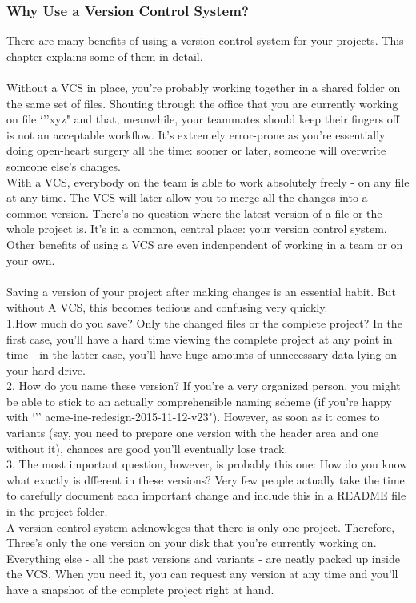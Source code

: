 \documentclass{book}
\begin{document}
   \section{Why Use a Version Control System?}
   There are many benefits of using a version control system for your projects. This chapter explains some of them in detail.\\
   \textbf{}\\
   Without a VCS in place, you're probably working together in a shared folder on the same set of files. Shouting through the office that you are currently working on file `''xyz" and that, meanwhile, your teammates should keep their fingers off is not an acceptable workflow. It's extremely error-prone as you're essentially doing open-heart surgery all the time: sooner or later, someone will overwrite someone else's changes.\\
   With a VCS, everybody on the team is able to work absolutely freely - on any file at any time. The VCS will later allow you to merge all the changes into a common version. There's no question where the latest version of a file or the whole project is. It's in a common, central place: your version control system.\\
   Other benefits of using a VCS are even indenpendent of working in a team or on your own.\\
   \textbf{}\\
   Saving a version of your project after making changes is an essential habit. But without A VCS, this becomes tedious and confusing very quickly.\\
   1.How much do you save? Only the changed files or the complete project? In the first case, you'll have a hard time viewing the complete project at any point in time - in the latter case, you'll have huge amounts of unnecessary data lying on your hard drive.\\
   2. How do you name these version? If you're a very organized person, you might be able to stick to an actually comprehensible naming scheme (if you're happy with `'' acme-ine-redesign-2015-11-12-v23"). However, as soon as it comes to variants (say, you need to prepare one version with the header area and one without it), chances are good you'll eventually lose track.\\
   3. The most important question, however, is probably this one: How do you know what exactly is dfferent in these versions? Very few people actually take the time to carefully document each important change and include this in a README file in the project folder.\\
	  A version control system acknowleges that there is only one project. Therefore, Three's only the one version on your disk that you're currently working on. Everything else - all the past versions and variants - are neatly packed up inside the VCS. When you need it, you can request any version at any time and you'll have a snapshot of the complete project right at hand.\\

\part{}
\end{document}
